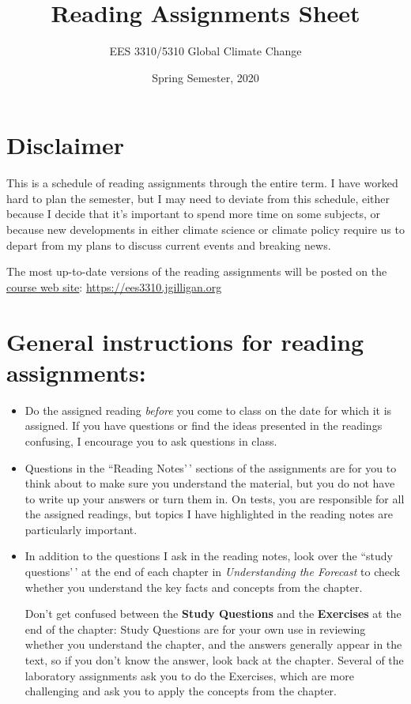 \documentclass[
]{article}
\title{Reading Assignments Sheet}
\author{EES 3310/5310 Global Climate Change}
\date{Spring Semester, 2020}
\begin{document}
\maketitle

\hypertarget{disclaimer}{%
\section{Disclaimer}\label{disclaimer}}

This is a schedule of reading assignments through the entire term. I
have worked hard to plan the semester, but I may need to deviate from
this schedule, either because I decide that it's important to spend more
time on some subjects, or because new developments in either climate
science or climate policy require us to depart from my plans to discuss
current events and breaking news.

The most up-to-date versions of the reading assignments will be posted
on the \href{https://ees3310.jgilligan.org}{course web site}:
\url{https://ees3310.jgilligan.org}

\hypertarget{general-instructions-for-reading-assignments}{%
\section{General instructions for reading
assignments:}\label{general-instructions-for-reading-assignments}}

\begin{itemize}
\item
  Do the assigned reading \emph{before} you come to class on the date
  for which it is assigned. If you have questions or find the ideas
  presented in the readings confusing, I encourage you to ask questions
  in class.
\item
  Questions in the ``Reading Notes'\,' sections of the assignments are
  for you to think about to make sure you understand the material, but
  you do not have to write up your answers or turn them in. On tests,
  you are responsible for all the assigned readings, but topics I have
  highlighted in the reading notes are particularly important.
\item
  In addition to the questions I ask in the reading notes, look over the
  ``study questions'\,' at the end of each chapter in
  \emph{Understanding the Forecast} to check whether you understand the
  key facts and concepts from the chapter.

  Don't get confused between the \textbf{Study Questions} and the
  \textbf{Exercises} at the end of the chapter: Study Questions are for
  your own use in reviewing whether you understand the chapter, and the
  answers generally appear in the text, so if you don't know the answer,
  look back at the chapter. Several of the laboratory assignments ask
  you to do the Exercises, which are more challenging and ask you to
  apply the concepts from the chapter.
\end{itemize}
\end{document}
